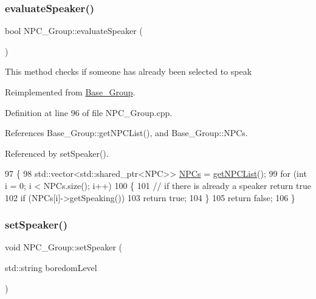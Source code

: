 \subsubsection{\texorpdfstring{evaluate\+Speaker()}{evaluateSpeaker()}}
{\footnotesize\ttfamily bool N\+P\+C\+\_\+\+Group\+::evaluate\+Speaker (\begin{DoxyParamCaption}{ }\end{DoxyParamCaption})\hspace{0.3cm}{\ttfamily [virtual]}}

This method checks if someone has already been selected to speak 

Reimplemented from \hyperlink{class_base___group_a8264ff598ce7e789c6419e2e6eef08fd}{Base\+\_\+\+Group}.



Definition at line 96 of file N\+P\+C\+\_\+\+Group.\+cpp.



References Base\+\_\+\+Group\+::get\+N\+P\+C\+List(), and Base\+\_\+\+Group\+::\+N\+P\+Cs.



Referenced by set\+Speaker().


\begin{DoxyCode}
97 \{
98     std::vector<std::shared\_ptr<NPC>> \hyperlink{class_base___group_a4757f3c06c73eea029f71b871c1d863e}{NPCs} = \hyperlink{class_base___group_a75eec9132aaf532b4429e0af76b31775}{getNPCList}();
99     \textcolor{keywordflow}{for} (\textcolor{keywordtype}{int} i = 0; i < NPCs.size(); i++)
100     \{
101         \textcolor{comment}{// if there is already a speaker return true}
102         \textcolor{keywordflow}{if} (NPCs[i]->getSpeaking())
103             \textcolor{keywordflow}{return} \textcolor{keyword}{true};
104     \}
105     \textcolor{keywordflow}{return} \textcolor{keyword}{false};
106 \}
\end{DoxyCode}
\mbox{\label{class_n_p_c___group_a5c1f3d1ad1f50910bb912ed828615ff8}} 
\subsubsection{\texorpdfstring{set\+Speaker()}{setSpeaker()}}
{\footnotesize\ttfamily void N\+P\+C\+\_\+\+Group\+::set\+Speaker (\begin{DoxyParamCaption}\item[{std\+::string}]{boredom\+Level }\end{DoxyParamCaption})\hspace{0.3cm}{\ttfamily [virtual]}}

